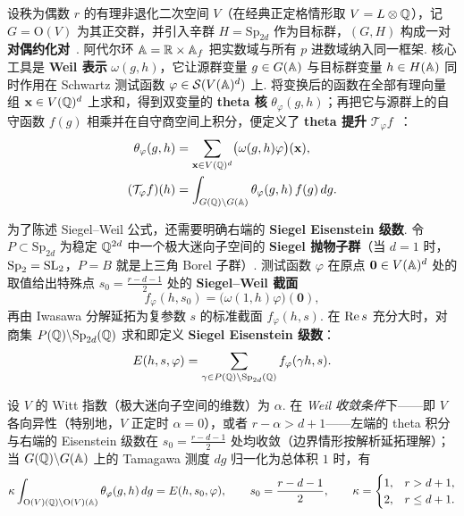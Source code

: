 设秩为偶数 $r$ 的有理非退化二次空间 $V$（在经典正定格情形取 $V=L\otimes\mathbb{Q}$），记 $G=\mathrm O(V)$ 为其正交群，并引入辛群 $H=\mathrm{Sp}_{2d}$ 作为目标群，$(G,H)$ 构成一对\textbf{对偶约化对}~\cite{Howe1979,Howe1989}. 阿代尔环 $\mathbb{A}=\mathbb{R}\times\mathbb{A}_f$ 把实数域与所有 $p$ 进数域纳入同一框架. 核心工具是 \textbf{Weil 表示} $\omega(g,h)$，它让源群变量 $g\in G(\mathbb{A})$ 与目标群变量 $h\in H(\mathbb{A})$ 同时作用在 Schwartz 测试函数 $\varphi\in\mathcal S(V(\mathbb{A})^d)$ 上. 将变换后的函数在全部有理向量组 $\mathbf x\in V(\mathbb{Q})^d$ 上求和，得到双变量的 \textbf{theta 核} $\theta_\varphi(g,h)$；再把它与源群上的自守函数 $f(g)$ 相乘并在自守商空间上积分，便定义了 \textbf{theta 提升} $\mathcal T_\varphi f$~\cite[第~334--337~页]{Li2023}：
\[
\begin{aligned}
\theta_\varphi(g,h)&=\sum_{\mathbf x\in V(\mathbb{Q})^d}\bigl(\omega(g,h)\varphi\bigr)(\mathbf x),\\
(\mathcal T_\varphi f)(h)&=\int_{G(\mathbb{Q})\backslash G(\mathbb{A})}\theta_\varphi(g,h)\,f(g)\,dg.
\end{aligned}
\]

为了陈述 Siegel--Weil 公式，还需要明确右端的 \textbf{Siegel Eisenstein 级数}. 令 $P\subset\mathrm{Sp}_{2d}$ 为稳定 $\mathbb{Q}^{2d}$ 中一个极大迷向子空间的 \textbf{Siegel 抛物子群}（当 $d=1$ 时，$\mathrm{Sp}_2=\operatorname{SL}_2$，$P=B$ 就是上三角 Borel 子群）. 测试函数 $\varphi$ 在原点 $\mathbf 0\in V(\mathbb{A})^d$ 处的取值给出特殊点 $s_0=\frac{r-d-1}{2}$ 处的 \textbf{Siegel--Weil 截面}
\[
f_\varphi(h,s_0)=\bigl(\omega(1,h)\varphi\bigr)(\mathbf 0),
\]
再由 Iwasawa 分解延拓为复参数 $s$ 的标准截面 $f_\varphi(h,s)$. 在 $\operatorname{Re} s$ 充分大时，对商集 $P(\mathbb{Q})\backslash\mathrm{Sp}_{2d}(\mathbb{Q})$ 求和即定义 \textbf{Siegel Eisenstein 级数}：
\[
E(h,s,\varphi)=\sum_{\gamma\in P(\mathbb{Q})\backslash\mathrm{Sp}_{2d}(\mathbb{Q})}f_\varphi(\gamma h,s).
\]

\begin{theorem}
设 $V$ 的 Witt 指数（极大迷向子空间的维数）为 $\alpha$. 在 \emph{Weil 收敛条件}下——即 $V$ 各向异性（特别地，$V$ 正定时 $\alpha=0$），或者 $r-\alpha>d+1$——左端的 theta 积分与右端的 Eisenstein 级数在 $s_0=\frac{r-d-1}{2}$ 处均收敛（边界情形按解析延拓理解）；当 $G(\mathbb{Q})\backslash G(\mathbb{A})$ 上的 Tamagawa 测度 $dg$ 归一化为总体积 $1$ 时，有
\[
\kappa\int_{\mathrm O(V)(\mathbb{Q})\backslash\mathrm O(V)(\mathbb{A})}\theta_\varphi(g,h)\,dg
=E(h,s_0,\varphi),
\qquad
s_0=\frac{r-d-1}{2},
\qquad
\kappa=\begin{cases} 1, & r>d+1,\\ 2, & r\le d+1. \end{cases}
\]
\end{theorem}

